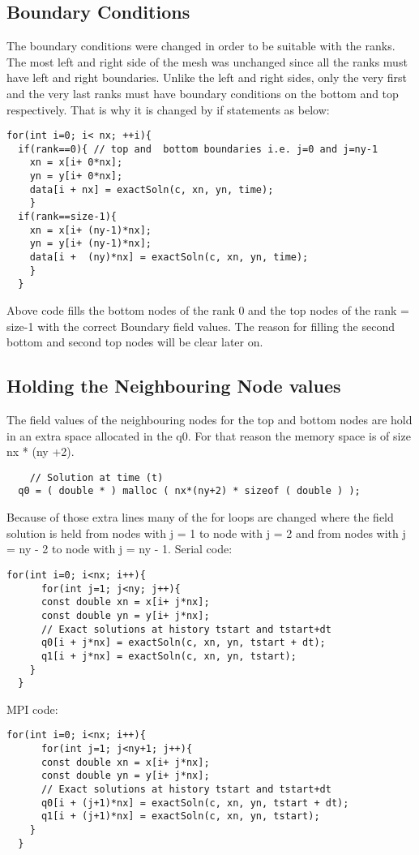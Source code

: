 \documentclass{article}
\begin{document}
\subsection{Boundary Conditions}
The boundary conditions were changed in order to be suitable with the ranks. The most left and right side of the mesh was unchanged since all the ranks must have left and right boundaries. Unlike the left and right sides, only the very first and the very last ranks must have boundary conditions on the bottom and top respectively. That is why it is changed by if statements as below:
\begin{verbatim}
for(int i=0; i< nx; ++i){
  if(rank==0){ // top and  bottom boundaries i.e. j=0 and j=ny-1
    xn = x[i+ 0*nx]; 
    yn = y[i+ 0*nx]; 
    data[i + nx] = exactSoln(c, xn, yn, time); 
    }
  if(rank==size-1){
    xn = x[i+ (ny-1)*nx]; 
    yn = y[i+ (ny-1)*nx];       
    data[i +  (ny)*nx] = exactSoln(c, xn, yn, time);
    } 
  }
\end{verbatim}
Above code fills the bottom nodes of the rank 0 and the top nodes of the rank = size-1 with the correct Boundary field values. The reason for filling the second bottom and second top nodes will be clear later on.
\subsection{Holding the Neighbouring Node values}
The field values of the neighbouring nodes for the top and bottom nodes are hold in an extra space allocated in the q0. For that reason the memory space is of size nx * (ny +2). 
\begin{verbatim}
    // Solution at time (t)
  q0 = ( double * ) malloc ( nx*(ny+2) * sizeof ( double ) );
\end{verbatim}
Because of those extra lines many of the for loops are changed where the field solution is held from nodes with j = 1 to node with j = 2 and from nodes with j = ny - 2 to node with j = ny - 1. 
Serial code:
\begin{verbatim}
for(int i=0; i<nx; i++){
      for(int j=1; j<ny; j++){
      const double xn = x[i+ j*nx]; 
      const double yn = y[i+ j*nx]; 
      // Exact solutions at history tstart and tstart+dt
      q0[i + j*nx] = exactSoln(c, xn, yn, tstart + dt);  
      q1[i + j*nx] = exactSoln(c, xn, yn, tstart);  
    }
  }   
\end{verbatim}
MPI code:
\begin{verbatim}
for(int i=0; i<nx; i++){
      for(int j=1; j<ny+1; j++){
      const double xn = x[i+ j*nx]; 
      const double yn = y[i+ j*nx]; 
      // Exact solutions at history tstart and tstart+dt
      q0[i + (j+1)*nx] = exactSoln(c, xn, yn, tstart + dt);  
      q1[i + (j+1)*nx] = exactSoln(c, xn, yn, tstart);  
    }
  }
\end{verbatim}
\end{document}

